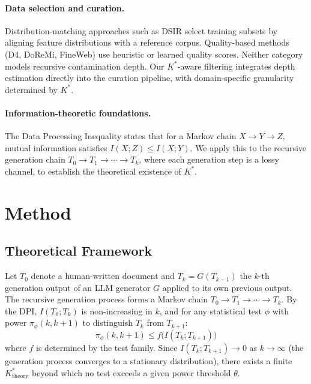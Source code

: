 \documentclass[11pt,a4paper]{article}
\newcommand{\kstar}{K^{*}}
\begin{document}
\paragraph{Data selection and curation.}
Distribution-matching approaches such as DSIR select training subsets by aligning feature distributions with a reference corpus.
Quality-based methods (D4, DoReMi, FineWeb) use heuristic or learned quality scores.
Neither category models recursive contamination depth. Our $\kstar$-aware filtering integrates depth estimation directly into the curation pipeline, with domain-specific granularity determined by $\kstar$.

\paragraph{Information-theoretic foundations.}
The Data Processing Inequality states that for a Markov chain $X \to Y \to Z$, mutual information satisfies $I(X;Z) \leq I(X;Y)$.
We apply this to the recursive generation chain $T_0 \to T_1 \to \cdots \to T_k$, where each generation step is a lossy channel, to establish the theoretical existence of $\kstar$.

\section{Method}

\subsection{Theoretical Framework}

Let $T_0$ denote a human-written document and $T_k = G(T_{k-1})$ the $k$-th generation output of an LLM generator $G$ applied to its own previous output.
The recursive generation process forms a Markov chain $T_0 \to T_1 \to \cdots \to T_k$.
By the DPI, $I(T_0; T_k)$ is non-increasing in $k$, and for any statistical test $\phi$ with power $\pi_\phi(k, k+1)$ to distinguish $T_k$ from $T_{k+1}$:
\begin{equation}
  \pi_\phi(k, k+1) \leq f\bigl(I(T_k; T_{k+1})\bigr)
\end{equation}
where $f$ is determined by the test family.
Since $I(T_k; T_{k+1}) \to 0$ as $k \to \infty$ (the generation process converges to a stationary distribution), there exists a finite $\kstar_{\mathrm{theory}}$ beyond which no test exceeds a given power threshold $\theta$.
\end{document}
